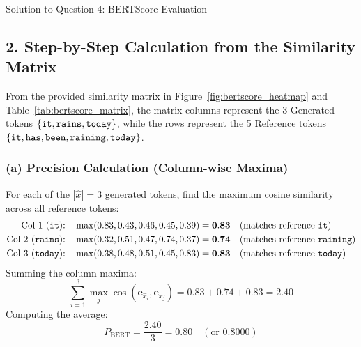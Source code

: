 \documentclass[11pt,a4paper]{article}
\begin{document}
\begin{solutionbox}{Solution to Question 4: BERTScore Evaluation}
\subsection*{2. Step-by-Step Calculation from the Similarity Matrix}
From the provided similarity matrix in Figure~\ref{fig:bertscore_heatmap} and Table~\ref{tab:bertscore_matrix}, the matrix columns represent the 3 Generated tokens $\{\text{\texttt{it}}, \text{\texttt{rains}}, \text{\texttt{today}}\}$, while the rows represent the 5 Reference tokens $\{\text{\texttt{it}}, \text{\texttt{has}}, \text{\texttt{been}}, \text{\texttt{raining}}, \text{\texttt{today}}\}$.

\subsubsection*{(a) Precision Calculation (Column-wise Maxima)}
For each of the $|\hat{x}| = 3$ generated tokens, find the maximum cosine similarity across all reference tokens:
\begin{align}
    \text{Col 1 (\texttt{it}):} \quad & \max(0.83, 0.43, 0.46, 0.45, 0.39) = \mathbf{0.83} \quad (\text{matches reference \texttt{it}}) \\
    \text{Col 2 (\texttt{rains}):} \quad & \max(0.32, 0.51, 0.47, 0.74, 0.37) = \mathbf{0.74} \quad (\text{matches reference \texttt{raining}}) \\
    \text{Col 3 (\texttt{today}):} \quad & \max(0.38, 0.48, 0.51, 0.45, 0.83) = \mathbf{0.83} \quad (\text{matches reference \texttt{today}})
\end{align}
Summing the column maxima:
\begin{equation}
    \sum_{i=1}^{3} \max_{j} \cos(\mathbf{e}_{\hat{x}_i}, \mathbf{e}_{x_j}) = 0.83 + 0.74 + 0.83 = 2.40
\end{equation}
Computing the average:
\begin{equation}
    P_{\text{BERT}} = \frac{2.40}{3} = \mathbf{0.80} \quad (\text{or } 0.8000)
\end{equation}


\end{solutionbox}
\end{document}
